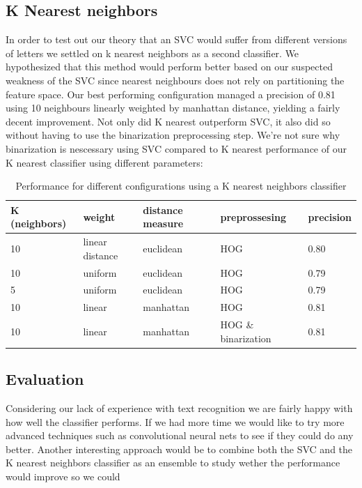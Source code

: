 \documentclass[paper=a4, fontsize=11pt]{scrartcl} %
\numberwithin{equation}{section} %
\numberwithin{figure}{section} %
\numberwithin{table}{section} %
\begin{document}
\subsection{K Nearest neighbors}
In order to test out our theory that an SVC would suffer from
different versions of letters we settled on k nearest neighbors as a
second classifier.  We hypothesized that this method would perform
better based on our suspected weakness of the SVC since nearest
neighbours does not rely on partitioning the feature space.  Our best
performing configuration managed a precision of 0.81 using 10
neighbours linearly weighted by manhattan distance, yielding a fairly
decent improvement.  Not only did K nearest outperform SVC, it also
did so without having to use the binarization preprocessing step.
We're not sure why binarization is nescessary using SVC compared to K
nearest %
performance of our K nearest classifier using different parameters:
\begin{table}[H]
    \centering
    \begin{tabular}{l | l | l | l | l}
        K (neighbors) & weight & distance measure & preprossesing & precision\\ \hline
        10 & linear distance & euclidean & HOG & 0.80\\ \hline
        10 & uniform & euclidean & HOG & 0.79\\ \hline
        5 & uniform & euclidean & HOG & 0.79\\ \hline
        10 & linear & manhattan & HOG & 0.81\\ \hline
        10 & linear & manhattan & HOG \& binarization & 0.81\\
    \end{tabular}
    \caption{Performance for different configurations using a K nearest neighbors classifier}
\end{table}
\subsection{Evaluation}
Considering our lack of experience with text recognition we are fairly happy with how well the classifier performs.
If we had more time we would like to try more advanced techniques such as convolutional neural nets to see if they could do any better.
Another interesting approach would be to combine both the SVC and the K nearest neighbors classifier as an ensemble to study wether the performance would improve so we could 
    

 
\end{document}
